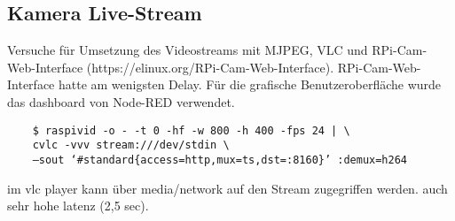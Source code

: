 \documentclass[BMR,Bachelor,ngerman]{twbook}%
\begin{document}
%
%
\subsection{Kamera Live-Stream}
Versuche für Umsetzung des Videostreams mit MJPEG, VLC und RPi-Cam-Web-Interface (https://elinux.org/RPi-Cam-Web-Interface). RPi-Cam-Web-Interface hatte am wenigsten Delay. Für die grafische Benutzeroberfläche wurde das dashboard von Node-RED verwendet.

\begin{verbatim}
	$ raspivid -o - -t 0 -hf -w 800 -h 400 -fps 24 | \ 
	cvlc -vvv stream:///dev/stdin \
	—sout ‘#standard{access=http,mux=ts,dst=:8160}’ :demux=h264
\end{verbatim}
im vlc player kann über media/network auf den Stream zugegriffen werden. auch sehr hohe latenz (2,5 sec).
%
\end{document}
